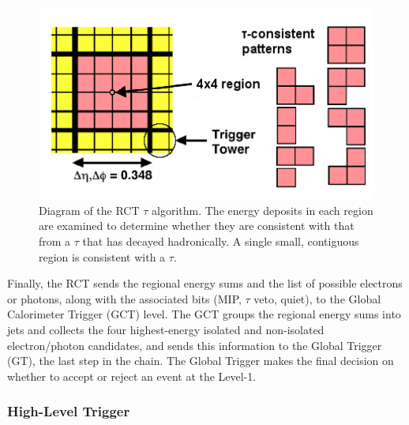  \begin{figure}[htb]
  \begin{center}
    \includegraphics[width=360pt]{Figures/RCT-tau-algo.png} 
  \end{center}
  \caption[\fixspacing Diagram of the RCT $\tau$ algorithm]{
    \fixspacing Diagram of the RCT $\tau$ algorithm. 
    The energy deposits in each region are 
    examined to determine whether they are 
    consistent with that from a $\tau$ 
    that has decayed hadronically.  
    A single small, contiguous region 
    is consistent with a $\tau$. 
  }
  \label{fig:RctTauAlgo}
 \end{figure}

Finally, the RCT sends the regional energy sums 
and the list of possible 
electrons or photons, 
along with the associated bits (MIP, $\tau$ veto, quiet), 
to the 
Global Calorimeter Trigger (GCT) level.  
The GCT groups the regional energy sums into jets 
and collects the four highest-energy isolated and 
non-isolated electron/photon candidates, 
and sends this information to the Global Trigger (GT), 
the last step in the chain.  
The Global Trigger makes the final decision on 
whether to accept or reject an event at the Level-1.  


\subsubsection{High-Level Trigger}
\label{exp:HLT}

